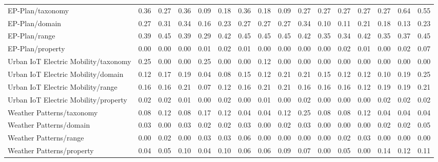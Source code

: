 \begin{tabular}{lccccccccccccccc}
EP-Plan/taxonomy & 0.36 & 0.27 & 0.36 & 0.09 & 0.18 & 0.36 & 0.18 & 0.09 & 0.27 & 0.27 & 0.27 & 0.27 & 0.27 & 0.64 & 0.55 \\
EP-Plan/domain & 0.27 & 0.31 & 0.34 & 0.16 & 0.23 & 0.27 & 0.27 & 0.27 & 0.34 & 0.10 & 0.11 & 0.21 & 0.18 & 0.13 & 0.23 \\
EP-Plan/range & 0.39 & 0.45 & 0.39 & 0.29 & 0.42 & 0.45 & 0.45 & 0.45 & 0.42 & 0.35 & 0.34 & 0.42 & 0.35 & 0.37 & 0.45 \\
EP-Plan/property & 0.00 & 0.00 & 0.00 & 0.01 & 0.02 & 0.01 & 0.00 & 0.00 & 0.00 & 0.00 & 0.02 & 0.01 & 0.00 & 0.02 & 0.07 \\
Urban IoT Electric Mobility/taxonomy & 0.25 & 0.00 & 0.00 & 0.25 & 0.00 & 0.00 & 0.12 & 0.00 & 0.00 & 0.00 & 0.00 & 0.00 & 0.00 & 0.00 & 0.00 \\
Urban IoT Electric Mobility/domain & 0.12 & 0.17 & 0.19 & 0.04 & 0.08 & 0.15 & 0.12 & 0.21 & 0.21 & 0.15 & 0.12 & 0.12 & 0.10 & 0.19 & 0.25 \\
Urban IoT Electric Mobility/range & 0.16 & 0.16 & 0.21 & 0.07 & 0.12 & 0.16 & 0.21 & 0.21 & 0.16 & 0.16 & 0.16 & 0.12 & 0.19 & 0.19 & 0.21 \\
Urban IoT Electric Mobility/property & 0.02 & 0.02 & 0.01 & 0.00 & 0.02 & 0.00 & 0.01 & 0.00 & 0.02 & 0.00 & 0.00 & 0.00 & 0.02 & 0.02 & 0.02 \\
Weather Patterns/taxonomy & 0.08 & 0.12 & 0.08 & 0.17 & 0.12 & 0.04 & 0.04 & 0.12 & 0.25 & 0.08 & 0.08 & 0.12 & 0.04 & 0.04 & 0.04 \\
Weather Patterns/domain & 0.03 & 0.00 & 0.03 & 0.02 & 0.02 & 0.03 & 0.00 & 0.02 & 0.03 & 0.00 & 0.00 & 0.00 & 0.02 & 0.02 & 0.05 \\
Weather Patterns/range & 0.00 & 0.02 & 0.00 & 0.03 & 0.03 & 0.06 & 0.00 & 0.00 & 0.00 & 0.00 & 0.02 & 0.03 & 0.00 & 0.00 & 0.00 \\
Weather Patterns/property & 0.04 & 0.05 & 0.10 & 0.04 & 0.10 & 0.06 & 0.06 & 0.09 & 0.07 & 0.00 & 0.05 & 0.00 & 0.14 & 0.12 & 0.11 \\
\bottomrule
\end{tabular}
